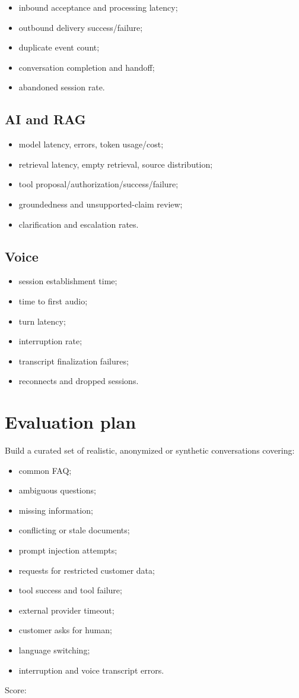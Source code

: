 \begin{itemize}
\item inbound acceptance and processing latency;
\item outbound delivery success/failure;
\item duplicate event count;
\item conversation completion and handoff;
\item abandoned session rate.
\end{itemize}
\subsection{AI and RAG}

\begin{itemize}
\item model latency, errors, token usage/cost;
\item retrieval latency, empty retrieval, source distribution;
\item tool proposal/authorization/success/failure;
\item groundedness and unsupported-claim review;
\item clarification and escalation rates.
\end{itemize}
\subsection{Voice}

\begin{itemize}
\item session establishment time;
\item time to first audio;
\item turn latency;
\item interruption rate;
\item transcript finalization failures;
\item reconnects and dropped sessions.
\end{itemize}
\section{Evaluation plan}

Build a curated set of realistic, anonymized or synthetic conversations covering:

\begin{itemize}
\item common FAQ;
\item ambiguous questions;
\item missing information;
\item conflicting or stale documents;
\item prompt injection attempts;
\item requests for restricted customer data;
\item tool success and tool failure;
\item external provider timeout;
\item customer asks for human;
\item language switching;
\item interruption and voice transcript errors.
\end{itemize}
Score:

